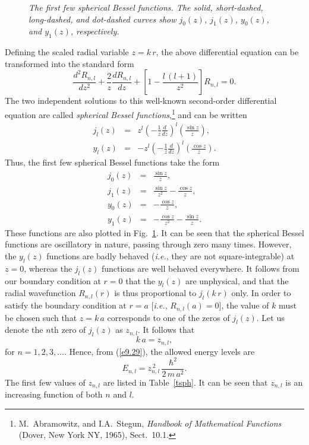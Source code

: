 \begin{figure}
\epsfysize=3in
\centerline{}
\caption{\em The first few spherical Bessel functions. The solid, short-dashed, long-dashed, and dot-dashed curves show $j_0(z)$, $j_1(z)$, $y_0(z)$, and $y_1(z)$, respectively.}\label{sph}   
\end{figure}

Defining the scaled radial variable $z=k\,r$, the above differential
equation can be transformed into the standard form
\begin{equation}
\frac{d^2 R_{n,l}}{dz^2} + \frac{2}{z}\frac{dR_{n,l}}{dz} + \left[1
- \frac{l\,(l+1)}{z^2}\right] R_{n,l} = 0.
\end{equation}
The two independent solutions to this well-known second-order differential  equation are called {\em spherical Bessel 
functions},\footnote{M.~Abramowitz,
and I.A.~Stegun, {\em Handbook of Mathematical Functions} (Dover,
New York NY, 1965), Sect.~10.1.}
and can be written
\begin{eqnarray}
j_l(z)&=& z^l\left(-\frac{1}{z}\frac{d}{dz}\right)^l\left(\frac{\sin z}{z}\right),\\[0.5ex]
y_l(z)&=& -z^l\left(-\frac{1}{z}\frac{d}{dz}\right)^l\left(\frac{\cos z}{z}\right).
\end{eqnarray}
Thus, the first few spherical Bessel functions take the form
\begin{eqnarray}
j_0(z) &=& \frac{\sin z}{z},\\[0.5ex]
j_1(z)&=&\frac{\sin z}{z^2} - \frac{\cos z}{z},\\[0.5ex]
y_0(z) &=& - \frac{\cos z}{z},\\[0.5ex]
y_1(z) &=& - \frac{\cos z}{z^2} - \frac{\sin z}{z}.
\end{eqnarray}
These functions are also plotted in Fig.~\ref{sph}. It can be seen that
the spherical Bessel functions are oscillatory in nature, passing through
zero many times. However, the $y_l(z)$ functions are badly
behaved  ({\em i.e.}, they are not square-integrable) at $z=0$, whereas
the $j_l(z)$ functions are well behaved everywhere. It follows from
our boundary condition at $r=0$ that the $y_l(z)$ are unphysical, and that the radial wavefunction $R_{n,l}(r)$
is thus proportional to $j_l(k\,r)$ only. In order to satisfy the boundary
condition at $r=a$ [{\em i.e.}, $R_{n,l}(a)=0$], the value of $k$ must
be chosen such that $z=k\,a$ corresponds to one of the zeros of $j_l(z)$.
Let us denote the $n$th zero of $j_l(z)$ as $z_{n,l}$. It follows that
\begin{equation}
k\,a = z_{n,l},
\end{equation}
for $n=1,2,3,\ldots$. 
Hence, from (\ref{e9.29}), the allowed energy levels are
\begin{equation}\label{e9.39}
E_{n,l} = z_{n,l}^{\,2}\,\frac{\hbar^2}{2\,m\,a^2}.
\end{equation}
The first few values of $z_{n,l}$ are listed in Table~\ref{tsph}. It
can be seen that $z_{n,l}$ is an increasing function of both $n$ and $l$.

